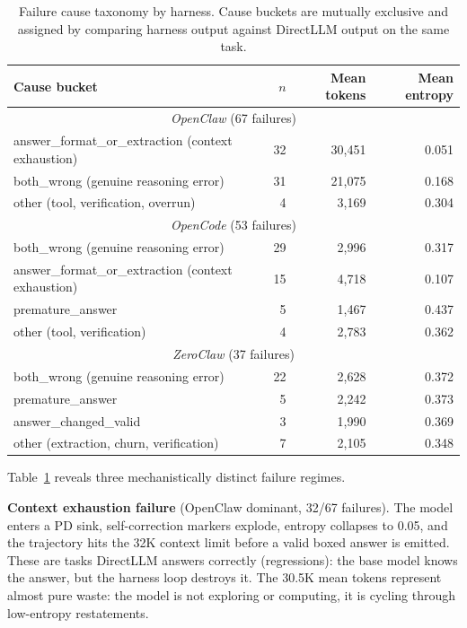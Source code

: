 \begin{table}[t]
\centering
\small
\caption{%
  Failure cause taxonomy by harness.
  Cause buckets are mutually exclusive and assigned by comparing harness output
  against DirectLLM output on the same task.
}
\label{tab:gpqa-failure-taxonomy}
\setlength{\tabcolsep}{3pt}
\begin{tabular}{lrrr}
\toprule
Cause bucket & $n$ & Mean tokens & Mean entropy \\
\midrule
\multicolumn{4}{c}{\textit{OpenClaw} (67 failures)} \\
\quad answer\_format\_or\_extraction (context exhaustion) & 32 & 30{,}451 & 0.051 \\
\quad both\_wrong (genuine reasoning error)               & 31 & 21{,}075 & 0.168 \\
\quad other (tool, verification, overrun)                &  4 &  3{,}169 & 0.304 \\
\midrule
\multicolumn{4}{c}{\textit{OpenCode} (53 failures)} \\
\quad both\_wrong (genuine reasoning error)               & 29 &  2{,}996 & 0.317 \\
\quad answer\_format\_or\_extraction (context exhaustion) & 15 &  4{,}718 & 0.107 \\
\quad premature\_answer                                   &  5 &  1{,}467 & 0.437 \\
\quad other (tool, verification)                         &  4 &  2{,}783 & 0.362 \\
\midrule
\multicolumn{4}{c}{\textit{ZeroClaw} (37 failures)} \\
\quad both\_wrong (genuine reasoning error)               & 22 &  2{,}628 & 0.372 \\
\quad premature\_answer                                   &  5 &  2{,}242 & 0.373 \\
\quad answer\_changed\_valid                              &  3 &  1{,}990 & 0.369 \\
\quad other (extraction, churn, verification)            &  7 &  2{,}105 & 0.348 \\
\bottomrule
\end{tabular}
\end{table}

Table~\ref{tab:gpqa-failure-taxonomy} reveals three mechanistically distinct
failure regimes.

\textbf{Context exhaustion failure} (OpenClaw dominant, 32/67 failures).
The model enters a PD sink, self-correction markers explode, entropy collapses
to 0.05, and the trajectory hits the 32K context limit before a valid boxed
answer is emitted.
These are tasks DirectLLM answers correctly (regressions): the base model knows
the answer, but the harness loop destroys it.
The 30.5K mean tokens represent almost pure waste: the model is not exploring
or computing, it is cycling through low-entropy restatements.

